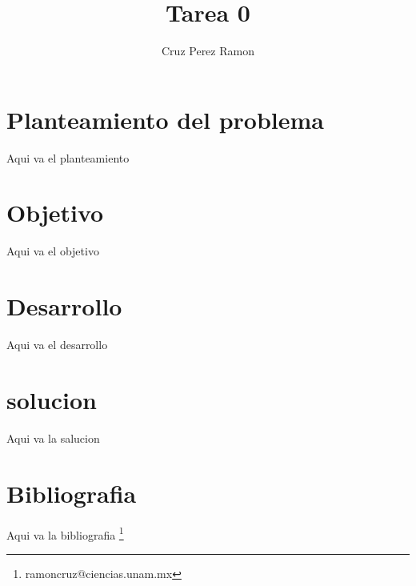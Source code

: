 \documentclass[12pt]{article}
\title{Tarea 0}
\author{Cruz Perez Ramon}
\begin{document}
\maketitle

\section{Planteamiento del problema}
Aqui va el planteamiento

\section{Objetivo}
Aqui va el objetivo

\section{Desarrollo}
Aqui va el desarrollo

\section{solucion}
Aqui va la salucion

\section{Bibliografia}
Aqui va la bibliografia
\footnote{ramoncruz@ciencias.unam.mx}
\end{document}
